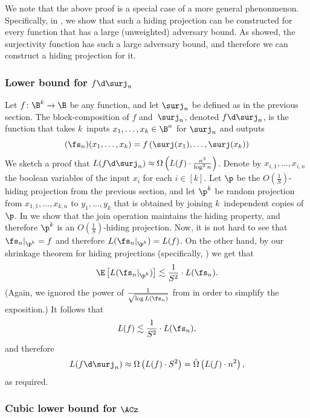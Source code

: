 \documentclass{toc}
\begin{document}
We note that the above proof is a special case of a more general phenonmenon. Specifically, in ,
we show that such a hiding projection can be constructed for every function that has a large (unweighted) adversary bound. As \cite{BM12} showed, the surjectivity function has such a large adversary bound, and therefore we can construct a hiding projection for it.

\subsubsection{Lower bound for \texorpdfstring{$f\protect\d\protect\surj_{n}$}{f o surj\_n}}

Let $f\colon\B^{k}\to\B$ be any function, and let $\surj_{n}$ be defined
as in the previous section. The block-composition of $f$ and~$\surj_{n}$,
denoted $f\d\surj_{n}$, is the function that takes $k$~inputs $x_{1},\ldots,x_{k}\in\B^{n}$
for $\surj_{n}$ and outputs
\[
(\fs_{n})(x_{1},\ldots,x_{k})=f\left(\surj(x_{1}),\ldots,\surj(x_{k})\right)
\]
We sketch a proof that $L(f\d\surj_{n})\approx\Omega\left(L(f)\cdot\frac{n^{2}}{\log^{2}n}\right)$.
Denote by $x_{i,1},\ldots,x_{i,n}$ the boolean variables of the input
$x_{i}$ for each $i\in\left[k\right]$. Let $\p$ be the $O(\frac{1}{S})$-hiding
projection from the previous section, and let $\p^{k}$ be random
projection from $x_{1,1},\ldots,x_{k,n}$ to $y_{1},\ldots,y_{k}$
that is obtained by joining $k$~independent copies of~$\p$. In
 we show that the join operation maintains the hiding
property, and therefore $\p^{k}$ is an $O(\frac{1}{S})$-hiding projection.
Now, it is not hard to see that $\fs_{n}|_{\p^{k}}=f$ and therefore
$L(\fs_{n}|_{\p^{k}})=L(f)$. On the other hand, by our shrinkage
theorem for hiding projections (specifically, 
)
we get that
\[
\E\left[L(\fs_{n}|_{\p^{k}})\right]\lesssim\frac{1}{S^{2}}\cdot L(\fs_{n}).
\]
(Again, we ignored the power of $\frac{1}{\sqrt{\log L(\fs_{n})}}$
from  in order to simplify the
exposition.) It follows that
\[
L(f)\lesssim\frac{1}{S^{2}}\cdot L(\fs_{n}),
\]
and therefore 
\[
L(f\d\surj_{n})\approx\Omega\left(L(f)\cdot S^{2}\right)=\tilde{\Omega}\left(L(f)\cdot n^{2}\right),
\]
as required.

\subsubsection{Cubic lower bound for \texorpdfstring{$\protect\ACz$}{AC0}}
\end{document}
